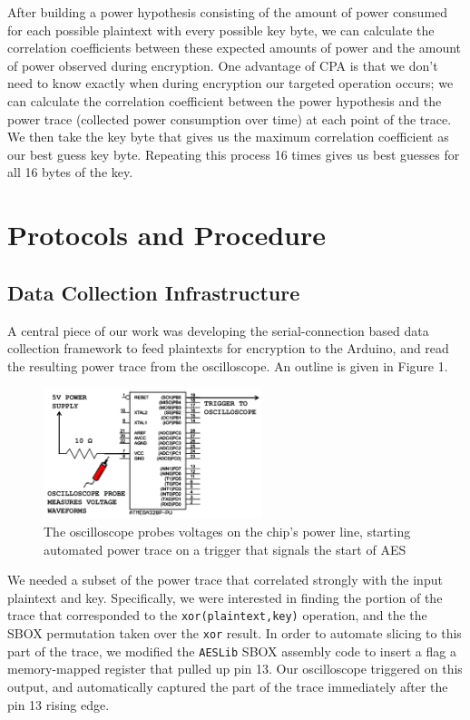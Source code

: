 \documentclass[journal]{ieee_style}
\begin{document}
After building a power hypothesis consisting of the amount of power consumed for each possible plaintext with every possible key byte, we can calculate the correlation coefficients between these expected amounts of power and the amount of power observed during encryption. One advantage of CPA is that we don't need to know exactly when during encryption our targeted operation occurs; we can calculate the correlation coefficient between the power hypothesis and the power trace (collected power consumption over time) at each point of the trace. We then take the key byte that gives us the maximum correlation coefficient as our best guess key byte. Repeating this process 16 times gives us best guesses for all 16 bytes of the key.


\section{Protocols and Procedure}
\subsection{Data Collection Infrastructure}
A central piece of our work was developing the serial-connection based data collection framework to feed plaintexts for encryption to the Arduino, and read the resulting power trace from the oscilloscope. An outline is given in Figure 1.

\begin{figure}[!t]
\centering
\includegraphics[width=2.5in]{Experiment_Setup}
\caption{The oscilloscope probes voltages on the chip's power line, starting automated power trace on a trigger that signals the start of AES}
\label{fig_sim}
\end{figure}

We needed a subset of the power trace that correlated strongly with the input plaintext and key. Specifically, we were interested in finding the portion of the trace that corresponded to the \texttt{xor(plaintext,key)} operation, and the the SBOX permutation taken over the \texttt{xor} result. In order to automate slicing to this part of the trace, we modified the \texttt{AESLib} SBOX assembly code to insert a flag a memory-mapped register that pulled up pin 13. Our oscilloscope triggered on this output, and automatically captured the part of the trace immediately after the pin 13 rising edge. 
\end{document}
